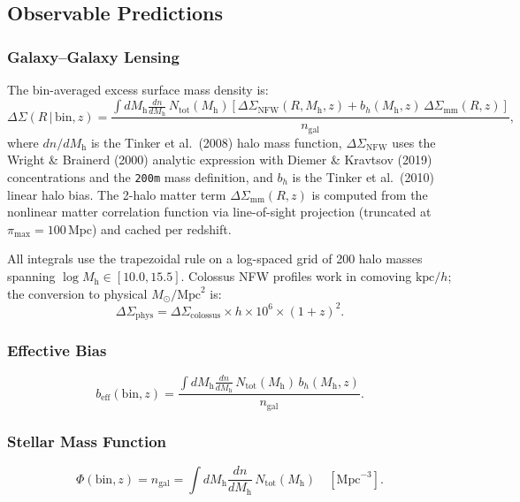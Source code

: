 \documentclass[12pt, letterpaper]{article}
\newcommand{\Msun}{M_\odot}
\newcommand{\Mh}{M_\mathrm{h}}
\newcommand{\DS}{\Delta\Sigma}
\newcommand{\beff}{b_\mathrm{eff}}
\newcommand{\ngal}{n_\mathrm{gal}}
\begin{document}
\subsection{Observable Predictions}

\subsubsection{Galaxy--Galaxy Lensing}

The bin-averaged excess surface mass density is:
\begin{equation}
\DS(R\,|\,\mathrm{bin}, z) = \frac{
    \int d\Mh \frac{dn}{d\Mh}\,N_\mathrm{tot}(\Mh)
    \left[\DS_\mathrm{NFW}(R, \Mh, z) +
          b_h(\Mh, z)\,\DS_\mathrm{mm}(R, z)\right]
}{n_\mathrm{gal}},
\label{eq:ds}
\end{equation}
where $dn/d\Mh$ is the Tinker et al.\ (2008) halo mass function,
$\DS_\mathrm{NFW}$ uses the Wright \& Brainerd (2000) analytic
expression with Diemer \& Kravtsov (2019) concentrations and the
\texttt{200m} mass definition, and $b_h$ is the Tinker et al.\ (2010)
linear halo bias.
The 2-halo matter term $\DS_\mathrm{mm}(R, z)$ is computed from the
nonlinear matter correlation function via line-of-sight projection
(truncated at $\pi_\mathrm{max} = 100\,\mathrm{Mpc}$) and cached per
redshift.

All integrals use the trapezoidal rule on a log-spaced grid of 200
halo masses spanning $\log\Mh \in [10.0, 15.5]$.
Colossus NFW profiles work in comoving $\mathrm{kpc}/h$; the
conversion to physical $\Msun/\mathrm{Mpc}^2$ is:
\begin{equation}
\DS_\mathrm{phys} = \DS_\mathrm{colossus} \times h \times 10^6
    \times (1+z)^2.
\end{equation}


\subsubsection{Effective Bias}

\begin{equation}
\beff(\mathrm{bin}, z) = \frac{
    \int d\Mh \frac{dn}{d\Mh}\,N_\mathrm{tot}(\Mh)\,b_h(\Mh, z)
}{\ngal}.
\end{equation}


\subsubsection{Stellar Mass Function}

\begin{equation}
\Phi(\mathrm{bin}, z) = \ngal = \int d\Mh \frac{dn}{d\Mh}\,
    N_\mathrm{tot}(\Mh) \quad [\mathrm{Mpc}^{-3}].
\end{equation}
\end{document}
